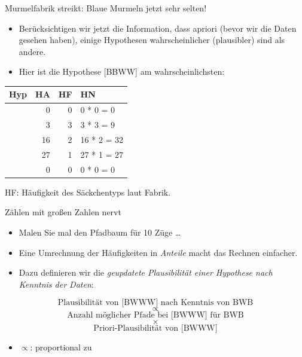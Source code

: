 \documentclass[
  ngerman,
  ignorenonframetext,
]{beamer}
\providecommand{\tightlist}{%
  \setlength{\itemsep}{0pt}\setlength{\parskip}{0pt}}
\begin{document}
\begin{frame}{Murmelfabrik streikt: Blaue Murmeln jetzt sehr selten!}
\protect\hypertarget{murmelfabrik-streikt-blaue-murmeln-jetzt-sehr-selten}{}
\begin{itemize}
\item
  Berücksichtigen wir jetzt die Information, dass apriori (bevor wir die
  Daten gesehen haben), einige Hypothesen wahrscheinlicher (plausibler)
  sind als andere.
\item
  Hier ist die Hypothese {[}BBWW{]} am wahrscheinlichsten:
\end{itemize}

\begin{tabular}{l|r|r|l}
\hline
Hyp & HA & HF & HN\\
\hline
[W W W W] & 0 & 0 & 0 * 0 = 0\\
\hline
[B W W W] & 3 & 3 & 3 * 3 = 9\\
\hline
[B B W W] & 16 & 2 & 16 * 2 = 32\\
\hline
[B B B W] & 27 & 1 & 27 * 1 = 27\\
\hline
[B B B B] & 0 & 0 & 0 * 0 = 0\\
\hline
\end{tabular}

HF: Häufigkeit des Säckchentyps laut Fabrik.
\end{frame}

\begin{frame}{Zählen mit großen Zahlen nervt}
\protect\hypertarget{zuxe4hlen-mit-grouxdfen-zahlen-nervt}{}
\begin{itemize}
\item
  Malen Sie mal den Pfadbaum für 10 Züge \ldots{}
\item
  Eine Umrechnung der Häufigkeiten in \emph{Anteile} macht das Rechnen
  einfacher.
\item
  Dazu definieren wir die \emph{geupdatete Plausibilität einer Hypothese
  nach Kenntnis der Daten}:
\end{itemize}

\[\text{Plausibilität von [BWWW] nach Kenntnis von BWB}\] \[\propto\]
\[\text{Anzahl möglicher Pfade bei [BWWW] für BWB}\] \[\times\]
\[\text{Priori-Plausibilität von [BWWW]}\]

\begin{itemize}
\tightlist
\item
  \(\propto\): proportional zu
\end{itemize}
\end{frame}
\end{document}
